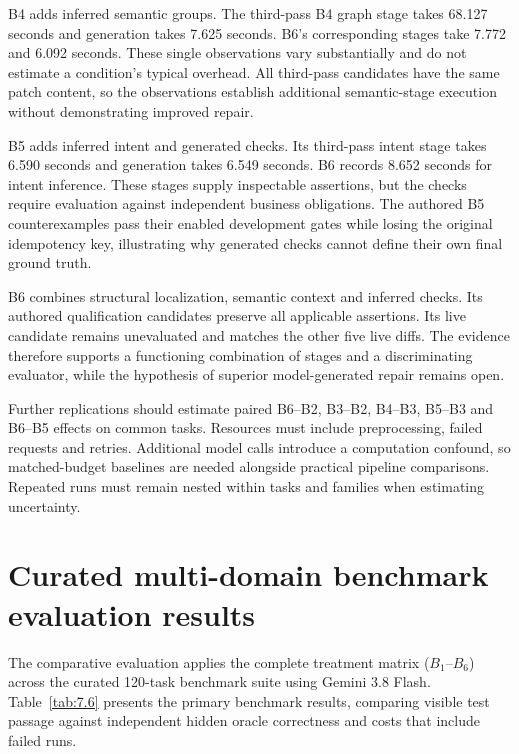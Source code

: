 \documentclass[12pt,a4paper,oneside]{report}
\begin{document}
B4 adds inferred semantic groups. The third-pass B4 graph stage takes 68.127 seconds and generation takes 7.625 seconds. B6's corresponding stages take 7.772 and 6.092 seconds. These single observations vary substantially and do not estimate a condition's typical overhead. All third-pass candidates have the same patch content, so the observations establish additional semantic-stage execution without demonstrating improved repair.

B5 adds inferred intent and generated checks. Its third-pass intent stage takes 6.590 seconds and generation takes 6.549 seconds. B6 records 8.652 seconds for intent inference. These stages supply inspectable assertions, but the checks require evaluation against independent business obligations. The authored B5 counterexamples pass their enabled development gates while losing the original idempotency key, illustrating why generated checks cannot define their own final ground truth.

B6 combines structural localization, semantic context and inferred checks. Its authored qualification candidates preserve all applicable assertions. Its live candidate remains unevaluated and matches the other five live diffs. The evidence therefore supports a functioning combination of stages and a discriminating evaluator, while the hypothesis of superior model-generated repair remains open.

Further replications should estimate paired B6–B2, B3–B2, B4–B3, B5–B3 and B6–B5 effects on common tasks. Resources must include preprocessing, failed requests and retries. Additional model calls introduce a computation confound, so matched-budget baselines are needed alongside practical pipeline comparisons. Repeated runs must remain nested within tasks and families when estimating uncertainty.

\section{Curated multi-domain benchmark evaluation results}

The comparative evaluation applies the complete treatment matrix ($B_1$--$B_6$) across the curated 120-task benchmark suite using Gemini 3.8 Flash. Table~\ref{tab:7.6} presents the primary benchmark results, comparing visible test passage against independent hidden oracle correctness and costs that include failed runs.
\end{document}
